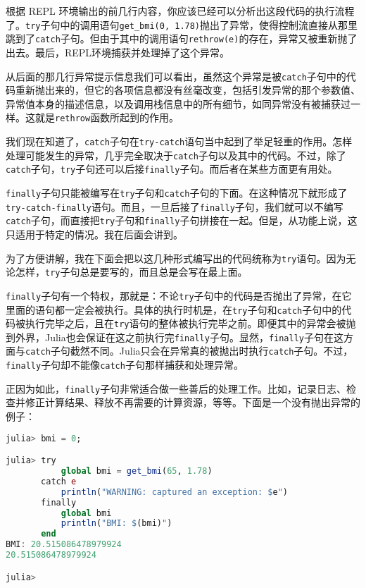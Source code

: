 根据 REPL 环境输出的前几行内容，你应该已经可以分析出这段代码的执行流程了。\verb`try`子句中的调用语句\verb`get_bmi(0, 1.78)`抛出了异常，使得控制流直接从那里跳到了\verb`catch`子句。但由于其中的调用语句\verb`rethrow(e)`的存在，异常又被重新抛了出去。最后，REPL环境捕获并处理掉了这个异常。

从后面的那几行异常提示信息我们可以看出，虽然这个异常是被\verb`catch`子句中的代码重新抛出来的，但它的各项信息都没有丝毫改变，包括引发异常的那个参数值、异常值本身的描述信息，以及调用栈信息中的所有细节，如同异常没有被捕获过一样。这就是\verb`rethrow`函数所起到的作用。

我们现在知道了，\verb`catch`子句在\verb`try-catch`语句当中起到了举足轻重的作用。怎样处理可能发生的异常，几乎完全取决于\verb`catch`子句以及其中的代码。不过，除了\verb`catch`子句，\verb`try`子句还可以后接\verb`finally`子句。而后者在某些方面更有用处。

\verb`finally`子句只能被编写在\verb`try`子句和\verb`catch`子句的下面。在这种情况下就形成了\verb`try-catch-finally`语句。而且，一旦后接了\verb`finally`子句，我们就可以不编写\verb`catch`子句，而直接把\verb`try`子句和\verb`finally`子句拼接在一起。但是，从功能上说，这只适用于特定的情况。我在后面会讲到。

为了方便讲解，我在下面会把以这几种形式编写出的代码统称为\verb`try`语句。因为无论怎样，\verb`try`子句总是要写的，而且总是会写在最上面。

\verb`finally`子句有一个特权，那就是：不论\verb`try`子句中的代码是否抛出了异常，在它里面的语句都一定会被执行。具体的执行时机是，在\verb`try`子句和\verb`catch`子句中的代码被执行完毕之后，且在\verb`try`语句的整体被执行完毕之前。即便其中的异常会被抛到外界，Julia也会保证在这之前执行完\verb`finally`子句。显然，\verb`finally`子句在这方面与\verb`catch`子句截然不同。Julia只会在异常真的被抛出时执行\verb`catch`子句。不过，\verb`finally`子句却不能像\verb`catch`子句那样捕获和处理异常。

正因为如此，\verb`finally`子句非常适合做一些善后的处理工作。比如，记录日志、检查并修正计算结果、释放不再需要的计算资源，等等。下面是一个没有抛出异常的例子：

\begin{lstlisting}[language=julia]
julia> bmi = 0;

julia> try 
           global bmi = get_bmi(65, 1.78)
       catch e
           println("WARNING: captured an exception: $e")
       finally
           global bmi
           println("BMI: $(bmi)")
       end
BMI: 20.515086478979924
20.515086478979924

julia> 
\end{lstlisting}

